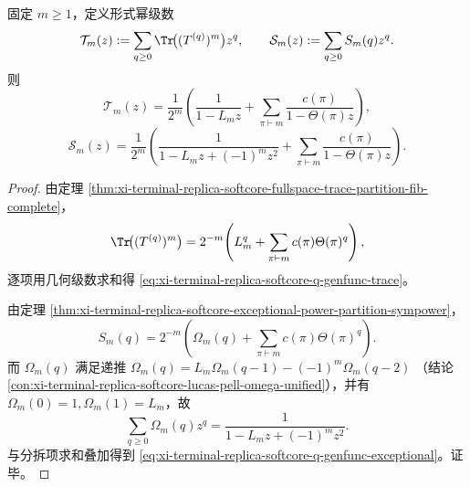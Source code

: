 \begin{theorem}\label{thm:xi-terminal-replica-softcore-q-genfunc-rational-partition}
固定 \(m\ge 1\)，定义形式幂级数
\[
\mathcal T_m(z):=\sum_{q\ge 0}\Tr\!\bigl((T^{(q)})^m\bigr)z^q,
\qquad
\mathcal S_m(z):=\sum_{q\ge 0}S_m(q)z^q.
\]
则
\begin{equation}\label{eq:xi-terminal-replica-softcore-q-genfunc-trace}
\mathcal T_m(z)
=\frac1{2^m}\left(
\frac{1}{1-L_m z}
+\sum_{\pi\vdash m}\frac{c(\pi)}{1-\Theta(\pi)z}
\right),
\end{equation}
\begin{equation}\label{eq:xi-terminal-replica-softcore-q-genfunc-exceptional}
\mathcal S_m(z)
=\frac1{2^m}\left(
\frac{1}{1-L_m z+(-1)^m z^2}
+\sum_{\pi\vdash m}\frac{c(\pi)}{1-\Theta(\pi)z}
\right).
\end{equation}
\end{theorem}
\begin{proof}
由定理 \ref{thm:xi-terminal-replica-softcore-fullspace-trace-partition-fib-complete}，
\[
\Tr\!\bigl((T^{(q)})^m\bigr)
=2^{-m}\!\left(L_m^q+\sum_{\pi\vdash m}c(\pi)\Theta(\pi)^q\right),
\]
逐项用几何级数求和得 \eqref{eq:xi-terminal-replica-softcore-q-genfunc-trace}。

由定理 \ref{thm:xi-terminal-replica-softcore-exceptional-power-partition-sympower}，
\[
S_m(q)=2^{-m}\!\left(\Omega_m(q)+\sum_{\pi\vdash m}c(\pi)\Theta(\pi)^q\right).
\]
而 \(\Omega_m(q)\) 满足递推
\(
\Omega_m(q)=L_m\Omega_m(q-1)-(-1)^m\Omega_m(q-2)
\)
（结论 \ref{con:xi-terminal-replica-softcore-lucas-pell-omega-unified}），并有
\(\Omega_m(0)=1,\Omega_m(1)=L_m\)，故
\[
\sum_{q\ge 0}\Omega_m(q)z^q=\frac{1}{1-L_m z+(-1)^m z^2}.
\]
与分拆项求和叠加得到 \eqref{eq:xi-terminal-replica-softcore-q-genfunc-exceptional}。证毕。
\end{proof}

